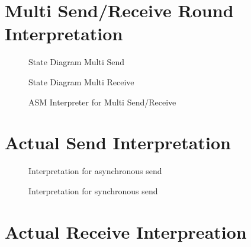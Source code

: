 %
%
\section{Multi Send/Receive Round Interpretation}

\begin{figure}[ph]
	\centering
	\caption{State Diagram Multi Send}
	\label{fig:ASM-Multi-Send}
\end{figure}

\begin{figure}[ph]
	\centering
	\caption{State Diagram Multi Receive}
	\label{fig:ASM-Multi-Receive}
\end{figure}

\begin{figure}[ph]
	\centering
	\caption{ASM Interpreter for Multi Send/Receive}
	\label{fig:ASM-Multi-Send-Receive}
\end{figure}



\newpage




\section{Actual Send Interpretation}

\begin{figure}[ph]
	\centering
	\caption[Interpretation for asynchronous send]{Interpretation for asynchronous send}
	\label{fig:asm-async-send}
\end{figure}

\begin{figure}
	\centering
	\caption[Interpretation for synchronous send]{Interpretation for synchronous send}
	\label{fig:asm-sync-send}
\end{figure}

\newpage
\section{Actual Receive Interpreation}


